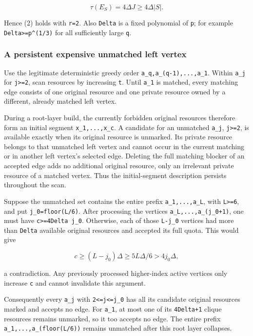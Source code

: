 \[
\tau(E_S)=4\Delta J
                         \ge4\Delta|S|.
\]

Hence (2) holds with \texttt{r=2}. Also \texttt{Delta} is a fixed polynomial of \texttt{p}; for example \texttt{Delta\textgreater{}=p\^{}(1/3)} for all sufficiently large \texttt{q}.

\hypertarget{af-6a8212874a-a-persistent-expensive-unmatched-left-vertex}{%
\subsubsection{A persistent expensive unmatched left vertex}\label{af-6a8212874a-a-persistent-expensive-unmatched-left-vertex}}

Use the legitimate deterministic greedy order \texttt{a\_q,a\_(q-1),...,a\_1}. Within \texttt{a\_j} for \texttt{j\textgreater{}=2}, scan resources by increasing \texttt{t}. Until \texttt{a\_1} is matched, every matching edge consists of one original resource and one private resource owned by a different, already matched left vertex.

During a root-layer build, the currently forbidden original resources therefore form an initial segment \texttt{x\_1,...,x\_c}. A candidate for an unmatched \texttt{a\_j}, \texttt{j\textgreater{}=2}, is available exactly when its original resource is unmarked. Its private resource belongs to that unmatched left vertex and cannot occur in the current matching or in another left vertex's selected edge. Deleting the full matching blocker of an accepted edge adds no additional original resource, only an irrelevant private resource of a matched vertex. Thus the initial-segment description persists throughout the scan.

Suppose the unmatched set contains the entire prefix \texttt{a\_1,...,a\_L}, with \texttt{L\textgreater{}=6}, and put \texttt{j\_0=floor(L/6)}. After processing the vertices \texttt{a\_L,...,a\_(j\_0+1)}, one must have \texttt{c\textgreater{}=4Delta\ j\_0}. Otherwise, each of those \texttt{L-j\_0} vertices had more than \texttt{Delta} available original resources and accepted its full quota. This would give

\[
c\ge(L-j_0)\Delta\ge5L\Delta/6
        >4j_0\Delta,
\]

a contradiction. Any previously processed higher-index active vertices only increase \texttt{c} and cannot invalidate this argument.

Consequently every \texttt{a\_j} with \texttt{2\textless{}=j\textless{}=j\_0} has all its candidate original resources marked and accepts no edge. For \texttt{a\_1}, at most one of its \texttt{4Delta+1} clique resources remains unmarked, so it too accepts no edge. The entire prefix \texttt{a\_1,...,a\_(floor(L/6))} remains unmatched after this root layer collapses.

